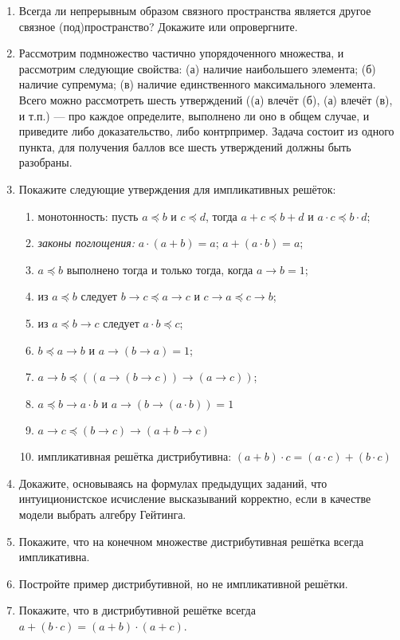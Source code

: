 \documentclass[10pt,a4paper,oneside]{article}
\begin{document}
\begin{enumerate}
\item Всегда ли непрерывным образом связного пространства является другое связное (под)пространство? Докажите или опровергните.

\item Рассмотрим подмножество частично упорядоченного множества, и рассмотрим следующие свойства:
(а) наличие наибольшего элемента; (б) наличие супремума;
(в) наличие единственного максимального элемента. Всего можно рассмотреть шесть утверждений ((а) влечёт (б), 
(а) влечёт (в), и т.п.) --- про каждое определите, выполнено ли оно в общем случае,
и приведите либо доказательство, либо контрпример. Задача состоит из одного пункта, для получения баллов 
все шесть утверждений должны быть разобраны.


\item Покажите следующие утверждения для импликативных решёток:
\begin{enumerate}
\item монотонность: пусть $a \preceq b$ и $c \preceq d$, тогда $a + c \preceq b + d$ и $a \cdot c \preceq b \cdot d$;
\item \emph{законы поглощения:} $a \cdot (a + b) = a$; $a + (a \cdot b) = a$;
\item $a \preceq b$ выполнено тогда и только тогда, когда $a \rightarrow b = 1$;
\item из $a \preceq b$ следует $b\rightarrow c \preceq a\rightarrow c$ и $c\rightarrow a \preceq c \rightarrow b$;
\item из $a \preceq b \rightarrow c$ следует $a \cdot b \preceq c$;
\item $b \preceq a \rightarrow b$ и $a \rightarrow (b \rightarrow a) = 1$;
\item $a \rightarrow b \preceq ((a \rightarrow (b \rightarrow c)) \rightarrow (a \rightarrow c))$;
\item $a \preceq b \rightarrow a \cdot b$ и $a \rightarrow (b \rightarrow (a \cdot b)) = 1$
\item $a \rightarrow c \preceq (b \rightarrow c) \rightarrow (a + b \rightarrow c)$
\item импликативная решётка дистрибутивна: $(a + b) \cdot c = (a \cdot c) + (b \cdot c)$
\end{enumerate}

\item Докажите, основываясь на формулах предыдущих заданий, что интуиционистское исчисление высказываний
корректно, если в качестве модели выбрать алгебру Гейтинга.

\item Покажите, что на конечном множестве дистрибутивная решётка всегда импликативна.
\item Постройте пример дистрибутивной, но не импликативной решётки.
\item Покажите, что в дистрибутивной решётке всегда $a + (b \cdot c) = (a + b) \cdot (a + c)$.


\end{enumerate}
\end{document}
